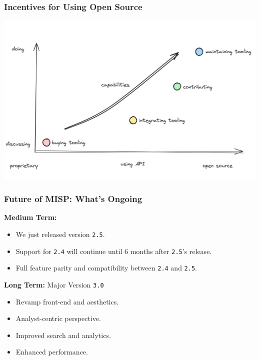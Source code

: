 \begin{frame}
    \frametitle{Incentives for Using Open Source}
    \begin{center}
        \includegraphics[width=0.8\linewidth]{opensource-csirt.png}
    \end{center}
\end{frame}

\begin{frame}
    \frametitle{Future of MISP: What's Ongoing}
    \begin{minipage}[t]{0.5\textwidth}
    \textbf{Medium Term:}
    \begin{itemize}
        \item We just released version \texttt{2.5}.
        \item Support for \texttt{2.4} will continue until 6 months after \texttt{2.5}'s release.
        \item Full feature parity and compatibility between \texttt{2.4} and \texttt{2.5}.
    \end{itemize}
    \end{minipage}%
    \begin{minipage}[t]{0.5\textwidth}
    \textbf{Long Term:} Major Version \texttt{3.0}
    \begin{itemize}
        \item Revamp front-end and aesthetics.
        \item Analyst-centric perspective.
        \item Improved search and analytics.
        \item Enhanced performance.
    \end{itemize}
    \end{minipage}%
\end{frame}

